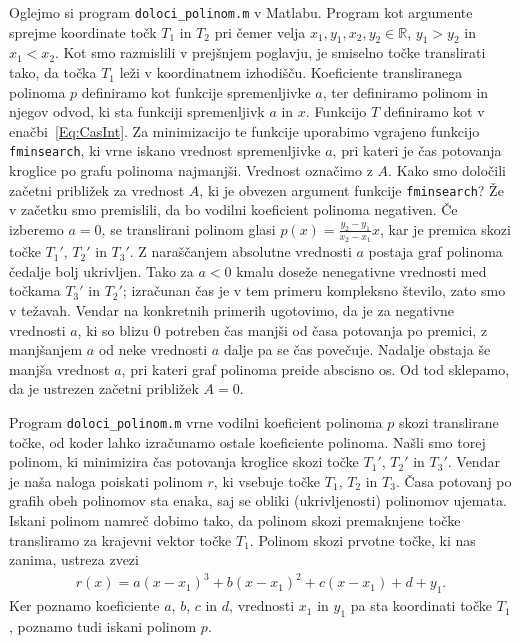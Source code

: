 \documentclass[a4paper]{article}
\begin{document}
Oglejmo si program \texttt{doloci\_polinom.m} v Matlabu.
Program kot argumente sprejme koordinate točk $T_1$ in $T_2$ pri čemer velja $x_1, y_1, x_2, y_2 \in \mathbb{R}$, $y_1 > y_2$ in $x_1 < x_2$. Kot smo razmislili v prejšnjem poglavju, je smiselno točke translirati tako, da točka $T_1$ leži v koordinatnem izhodišču. Koeficiente transliranega polinoma $p$ definiramo kot funkcije spremenljivke $a$, ter definiramo polinom in njegov odvod, ki sta funkciji spremenljivk $a$ in $x$. Funkcijo $T$ definiramo kot v enačbi~\eqref{Eq:CasInt}. Za minimizacijo te funkcije uporabimo vgrajeno funkcijo \texttt{fminsearch}, ki vrne iskano vrednost spremenljivke $a$, pri kateri je čas potovanja kroglice po grafu polinoma najmanjši. Vrednost označimo z $A$.
Kako smo določili začetni približek za vrednost $A$, ki je obvezen argument funkcije \texttt{fminsearch}? Že v začetku smo premislili, da bo vodilni koeficient polinoma negativen. Če izberemo $a=0$, se translirani polinom glasi $p(x) = \frac{y_2-y_1}{x_2-x_1} x$, kar je premica skozi točke $T_{1}'$, $T_{2}'$ in $T_{3}'$. Z naraščanjem absolutne vrednosti $a$ postaja graf polinoma čedalje bolj ukrivljen. Tako za $a<0$ kmalu doseže nenegativne vrednosti med točkama $T_{3}'$ in $T_{2}'$; izračunan čas je v tem primeru kompleksno število, zato smo v težavah. Vendar na konkretnih primerih ugotovimo, da je za negativne vrednosti $a$, ki so blizu $0$ potreben čas manjši od časa potovanja po premici, z manjšanjem $a$ od neke vrednosti $a$ dalje pa se čas povečuje. Nadalje obstaja še manjša vrednost $a$, pri kateri graf polinoma preide abscisno os. Od tod sklepamo, da je ustrezen začetni približek $A=0$.

Program \texttt{doloci\_polinom.m} vrne vodilni koeficient polinoma $p$ skozi translirane točke, od koder lahko izračunamo ostale koeficiente polinoma. 
Našli smo torej polinom, ki minimizira čas potovanja kroglice skozi točke $T_{1}'$, $T_{2}'$ in $T_{3}'$. Vendar je naša naloga poiskati polinom $r$, ki vsebuje točke $T_1$, $T_2$ in $T_3$. Časa potovanj po grafih obeh polinomov sta enaka, saj se obliki (ukrivljenosti) polinomov ujemata. Iskani polinom namreč dobimo tako, da polinom skozi premaknjene točke transliramo za krajevni vektor točke $T_1$.
Polinom skozi prvotne točke, ki nas zanima, ustreza zvezi
\begin{align}
\label{Eq:r(x)}
r(x) = a(x-x_1)^3 + b(x-x_1)^2 + c(x-x_1) + d + y_1.
\end{align}
Ker poznamo koeficiente $a$, $b$, $c$ in $d$, vrednosti $x_1$ in $y_1$ pa sta koordinati točke $T_1$, poznamo tudi iskani polinom $p$.
\end{document}
